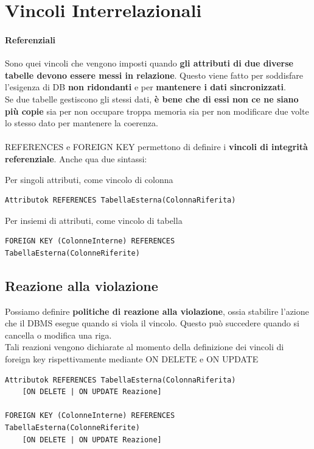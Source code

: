 \documentclass[10pt]{book}
\begin{document}
\section{Vincoli Interrelazionali}
\paragraph{Referenziali} Sono quei vincoli che vengono imposti quando \textbf{gli attributi di due diverse tabelle devono essere messi in relazione}. Questo viene fatto per soddisfare l'esigenza di DB \textbf{non ridondanti} e per \textbf{mantenere i dati sincronizzati}.\\
Se due tabelle gestiscono gli stessi dati, \textbf{è bene che di essi non ce ne siano più copie} sia per non occupare troppa memoria sia per non modificare due volte lo stesso dato per mantenere la coerenza.\\\\
REFERENCES e FOREIGN KEY permettono di definire i \textbf{vincoli di integrità referenziale}. Anche qua due sintassi:
\begin{list}{}{}
	\item Per singoli attributi, come vincolo di colonna
	\begin{lstlisting}
Attributok REFERENCES TabellaEsterna(ColonnaRiferita)
	\end{lstlisting}
	\item Per insiemi di attributi, come vincolo di tabella
	\begin{lstlisting}
FOREIGN KEY (ColonneInterne) REFERENCES TabellaEsterna(ColonneRiferite)
	\end{lstlisting}
\end{list}
\subsection{Reazione alla violazione}
Possiamo definire \textbf{politiche di reazione alla violazione}, ossia stabilire l'azione che il DBMS esegue quando si viola il vincolo. Questo può succedere quando si cancella o modifica una riga.\\
Tali reazioni vengono dichiarate al momento della definizione dei vincoli di foreign key rispettivamente mediante ON DELETE e ON UPDATE
\begin{lstlisting}
Attributok REFERENCES TabellaEsterna(ColonnaRiferita)
	[ON DELETE | ON UPDATE Reazione]

FOREIGN KEY (ColonneInterne) REFERENCES TabellaEsterna(ColonneRiferite)
	[ON DELETE | ON UPDATE Reazione]
\end{lstlisting}
\end{document}
